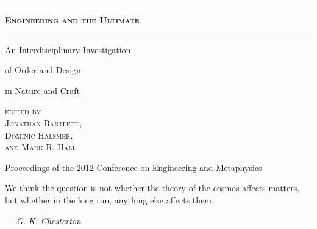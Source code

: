 \begin{titlepage}
\thispagestyle{empty}
\vspace*{\fill}
\begin{center}
\hrule
{\LARGE \textsc{\textbf{Engineering and the Ultimate}}}
\baselineskip
\hrule
{}\baselineskip
\begingroup
\setlength{\parskip}{0cm}
{\LARGE An Interdisciplinary Investigation}

{\LARGE of Order and Design}

{\LARGE in Nature and Craft}
\endgroup

\baselineskip

{\Large 
	{\textsc{ 
		\hfill edited by \hspace*{1in} \\ 
		\hfill Jonathan Bartlett, \hspace*{1in} \\ 
		\hfill Dominic Halsmer, \hspace*{1in} \\
		\hfill and Mark R. Hall \hspace*{1in} \\
	} }
}

\baselineskip


\end{center}
\begin{changemargin}{-1cm}{-1cm}
\begin{center}
{\large
	Proceedings of the 2012 Conference on Engineering and Metaphysics
}
\end{center}
\end{changemargin}

\vspace*{\fill}

\cleardoublepage %

\thispagestyle{empty}
\vspace*{\fill}
\begin{center}
\end{center}
\vspace*{\fill}

\clearpage

\vspace*{7em}
\begin{center}
\begin{minipage}{6in}
\begin{center}
We think the question is not whether the theory of the cosmos affects matters, \\ but whether in the long run, anything else affects them.
\end{center}
\hfill --- \textit{G. K. Chesterton}
\end{minipage}
\end{center}

\clearpage

\endgroup
\end{titlepage}
